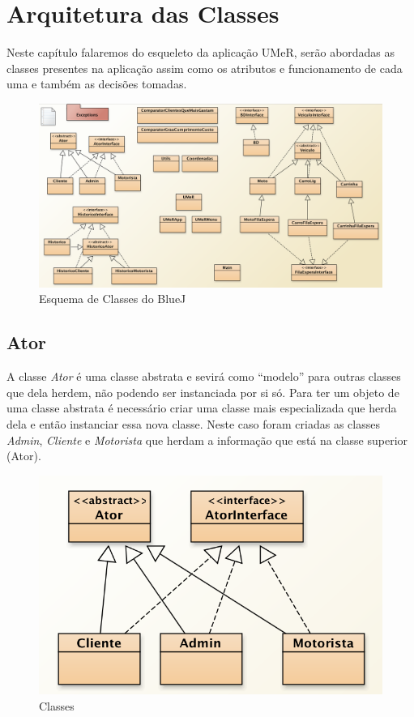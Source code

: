 \chapter{Arquitetura das Classes}
Neste capítulo falaremos do esqueleto da  aplicação UMeR, serão abordadas as classes presentes na aplicação assim como os atributos e funcionamento de cada uma e também as decisões tomadas.
\begin{figure}[htb]
	\centering
	\includegraphics[scale=0.45]{imagem/esquemaClasses}
	\caption{Esquema de Classes do BlueJ }
	\label{p2:fig:p2_classes}
\end{figure}

\newpage
\section{Ator}
A classe  \textit{Ator} é uma classe abstrata e sevirá  como “modelo” para outras classes que dela herdem, não podendo ser instanciada por si só. Para ter um objeto de uma classe abstrata é necessário criar uma classe mais especializada que herda dela e então instanciar essa nova classe. Neste caso foram criadas as classes \textit{Admin}, \textit{Cliente} e  \textit{Motorista} que herdam a informação que está na classe superior (Ator). 


\begin{figure}[htpb]
	\centering
	\includegraphics[scale=0.6]{imagem/atores}
	\caption{Classes }
	\label{p2:fig:p2_atoresr}
\end{figure}

